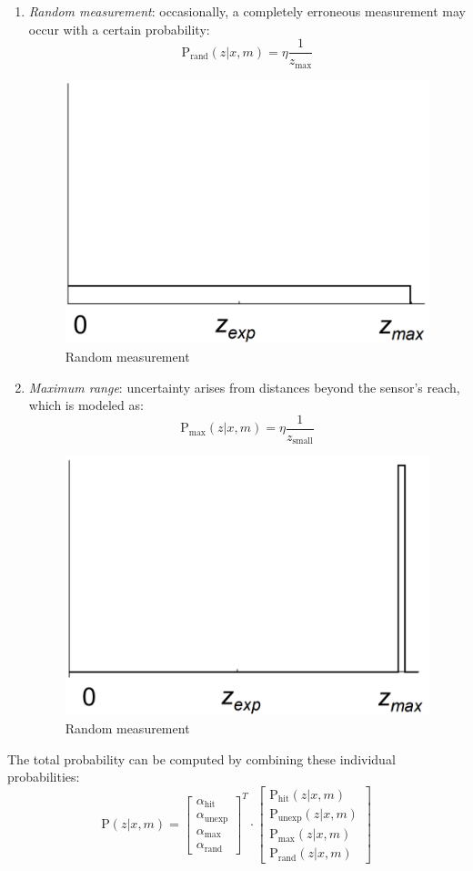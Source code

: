 \begin{enumerate}
\begin{figure}[H]
        \end{figure}
    \item \textit{Random measurement}: occasionally, a completely erroneous measurement may occur with a certain probability:
        \[\text{P}_{\text{rand}}(z|x,m)=\eta\dfrac{1}{z_{\max}}\]
        \begin{figure}[H]
            \centering
            \includegraphics[width=0.4\linewidth]{images/rm.png}
            \caption{Random measurement}
        \end{figure}
    \item \textit{Maximum range}: uncertainty arises from distances beyond the sensor's reach, which is modeled as:
        \[\text{P}_{\max}(z|x,m)=\eta \dfrac{1}{z_{\text{small}}}\]
        \begin{figure}[H]
            \centering
            \includegraphics[width=0.4\linewidth]{images/mr.png}
            \caption{Random measurement}
        \end{figure}
\end{enumerate}
The total probability can be computed by combining these individual probabilities:
\[\text{P}(z|x,m)=\begin{bmatrix}
    \alpha_{\text{hit}} \\
    \alpha_{\text{unexp}} \\
    \alpha_{\text{max}} \\
    \alpha_{\text{rand}}
\end{bmatrix}^T \cdot \begin{bmatrix}
    \text{P}_{\text{hit}}(z|x,m) \\
    \text{P}_{\text{unexp}}(z|x,m) \\
    \text{P}_{\text{max}}(z|x,m) \\
    \text{P}_{\text{rand}}(z|x,m)
\end{bmatrix}\]
